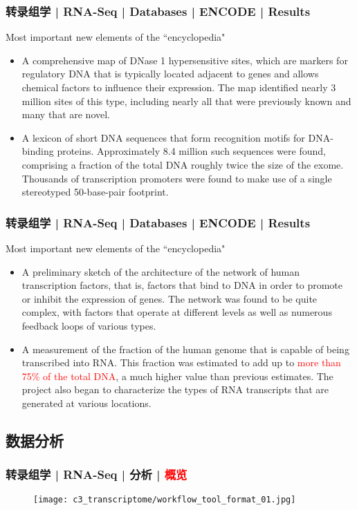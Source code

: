\begin{frame}
  \frametitle{转录组学 | RNA-Seq | Databases | ENCODE | Results}
  \begin{block}{Most important new elements of the ``encyclopedia"}
    \begin{itemize}
      \item A comprehensive map of DNase 1 hypersensitive sites, which are markers for regulatory DNA that is typically located adjacent to genes and allows chemical factors to influence their expression. The map identified nearly 3 million sites of this type, including nearly all that were previously known and many that are novel.
      \item A lexicon of short DNA sequences that form recognition motifs for DNA-binding proteins. Approximately 8.4 million such sequences were found, comprising a fraction of the total DNA roughly twice the size of the exome. Thousands of transcription promoters were found to make use of a single stereotyped 50-base-pair footprint.
    \end{itemize}
  \end{block}
\end{frame}

\begin{frame}
  \frametitle{转录组学 | RNA-Seq | Databases | ENCODE | Results}
  \begin{block}{Most important new elements of the ``encyclopedia"}
    \begin{itemize}
      \item A preliminary sketch of the architecture of the network of human transcription factors, that is, factors that bind to DNA in order to promote or inhibit the expression of genes. The network was found to be quite complex, with factors that operate at different levels as well as numerous feedback loops of various types.
      \item A measurement of the fraction of the human genome that is capable of being transcribed into RNA. This fraction was estimated to add up to \textcolor{red}{more than 75\% of the total DNA}, a much higher value than previous estimates. The project also began to characterize the types of RNA transcripts that are generated at various locations.
    \end{itemize}
  \end{block}
\end{frame}

\subsection{数据分析}
\begin{frame}
  \frametitle{转录组学 | RNA-Seq | 分析 | \textcolor{red}{概览}}
  \begin{figure}
    \centering
    \texttt{[image: c3\_transcriptome/workflow\_tool\_format\_01.jpg]}
  \end{figure}
\end{frame}

